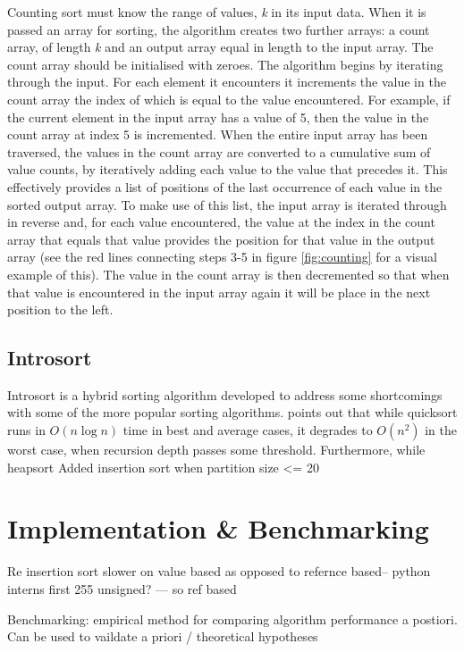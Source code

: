 \documentclass[12pt, a4paper]{article}
\begin{document}
Counting sort must know the range of values, \emph{k} in its input data. When it is passed an array for sorting, the algorithm creates two further arrays: a count array, of length \emph{k} and an output array equal in length to the input array. The count array should be initialised with zeroes. The algorithm begins by iterating through the input. For each element it encounters it increments the value in the count array the index of which is equal to the value encountered. For example, if the current element in the input array has a value of 5, then the value in the count array at index 5 is incremented. When the entire input array has been traversed, the values in the count array are converted to a cumulative sum of value counts, by iteratively adding each value to the value that precedes it. This effectively provides a list of positions of the last occurrence of each value in the sorted output array. To make use of this list, the input array is iterated through in reverse and, for each value encountered, the value at the index in the count array that equals that value provides the position for that value in the output array (see the red lines connecting steps 3-5 in figure \ref{fig:counting} for a visual example of this). The value in the count array is then decremented so that when that value is encountered in the input array again it will be place in the next position to the left.


\subsection{Introsort}\label{sec:introsort}

Introsort is a hybrid sorting algorithm developed to address some shortcomings with some of the more popular sorting algorithms. \textcite[983]{musser1997} points out that while quicksort runs in $O(n\log n)$ time in best and average cases, it degrades to $O(n^{2})$ in the worst case, when recursion depth passes some threshold. Furthermore, while heapsort 
Added insertion sort when partition size <= 20 


\section{Implementation \& Benchmarking}

Re insertion sort slower on value based as opposed to refernce based-- python interns first 255 unsigned? --- so ref based

Benchmarking: empirical method for comparing algorithm performance a postiori. Can be used to vaildate a priori / theoretical hypotheses
\end{document}
